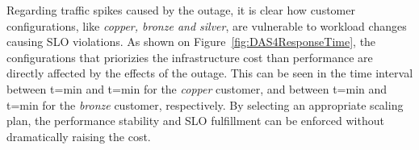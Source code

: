 

Regarding traffic spikes caused by the outage, it is clear how customer configurations, like \emph{copper, bronze and silver}, are vulnerable to workload changes causing SLO violations. As shown on Figure~\ref{fig:DAS4ResponseTime},  the configurations that priorizies the infrastructure cost than performance are directly affected by the effects of the outage. This can be seen in the time interval between t=min and t=min for the \emph{copper} customer, and between t=min and t=min for the \emph{bronze} customer, respectively. By selecting an appropriate scaling plan, the performance stability and SLO fulfillment can be enforced without dramatically raising the cost.






